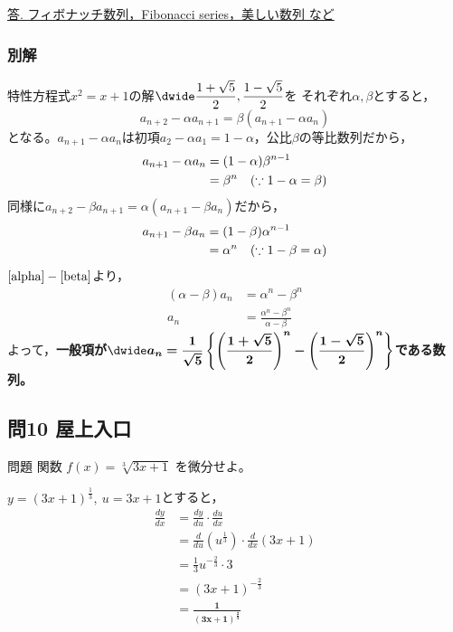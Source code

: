 \documentclass[a5paper]{ltjsarticle}
\begin{document}
\underline{答. フィボナッチ数列，Fibonacci series，美しい数列 など}
\subsubsection*{別解}
\setcounter{equation}{0}
特性方程式$x^2=x+1$の解$\displaystyle\dwide\frac{1+\sqrt{5}}{2},\frac{1-\sqrt{5}}{2}$を
それぞれ$\alpha,\beta$とすると，\[a_{n+2}-\alpha a_{n+1}=\beta(a_{n+1}-\alpha a_n)\]
となる。$a_{n+1}-\alpha a_n$は初項$a_2-\alpha a_1=1-\alpha$，公比$\beta$の等比数列だから，
\begin{align}
  a_{n+1}-\alpha a_n&=(1-\alpha)\beta^{n-1\notag}\\
  &=\beta^n \quad(\because 1-\alpha=\beta)\label{beta}
\end{align}
同様に$a_{n+2}-\beta a_{n+1}=\alpha(a_{n+1}-\beta a_n)$だから，
\begin{align}
  a_{n+1}-\beta a_{n}&=(1-\beta)\alpha^{n-1}\notag\\
  &=\alpha^n \quad(\because 1-\beta=\alpha)\label{alpha}
\end{align}
$\eqref{alpha}-\eqref{beta}$より，
\begin{align*}
  (\alpha-\beta)a_n&=\alpha^n-\beta^n\\
  a_n&=\frac{\alpha^n-\beta^n}{\alpha-\beta}
\end{align*}
よって，\qquad\textbf{一般項が$\displaystyle\dwide \bm{a_n=\frac{1}{\sqrt{5}}\left\{ {\left( \frac{1+\sqrt{5}}{2}\right)}^n - {\left( \frac{1-\sqrt{5}}{2}\right)}^n\right\}}$である数列。}


\subsection*{問10 屋上入口}
\begin{itembox}[l]{問題}
  関数 $f (x)=\sqrt[3]{3x+1}$ を微分せよ。
\end{itembox}

$y={(3x+1)}^{\frac{1}{3}},\: u=3x+1$とすると，
\begin{align*}
  \frac{dy}{dx}&=\frac{dy}{du}\cdot \frac{du}{dx}\\
  &=\frac{d}{du}\left(u^\frac{1}{3}\right)\cdot \frac{d}{dx}(3x+1)\\
  &=\frac{1}{3}u^{-\frac{2}{3}}\cdot 3\\
  &={(3x+1)}^{-\frac{2}{3}}\\
  &=\bm{\frac{1}{{(3x+1)}^{\frac{2}{3}}}}
\end{align*}


\newpage
\end{document}
